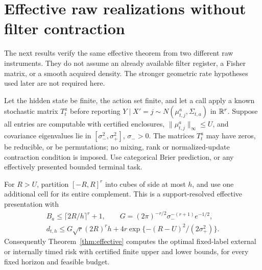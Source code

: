 \section{Effective raw realizations without filter contraction}\label{sec:effective_realizations}
The next results verify the same effective theorem from two different raw instruments. They do not assume an already available filter register, a Fisher matrix, or a smooth acquired density. The stronger geometric rate hypotheses used later are not required here.

\begin{theorem}\label{thm:effective_gaussian}
Let the hidden state be finite, the action set finite, and let a call apply a known stochastic matrix $T_t^a$ before reporting $Y\mid X'=j\sim N(\mu_{t,j}^a,\Sigma_{t,a})$ in $\mathbb R^r$. Suppose all entries are computable with certified enclosures, $\|\mu_{t,j}^a\|_\infty\le U$, and covariance eigenvalues lie in $[\sigma_-^2,\sigma_+^2]$, $\sigma_->0$. The matrices $T_t^a$ may have zeros, be reducible, or be permutations; no mixing, rank or normalized-update contraction condition is imposed. Use categorical Brier prediction, or any effectively presented bounded terminal task.

For $R>U$, partition $[-R,R]^r$ into cubes of side at most $h$, and use one additional cell for its entire complement. This is a support-resolved effective presentation with
\begin{equation}\label{eq:gaussian_effective}
 \begin{gathered}
 B_a\le\lceil2R/h\rceil^r+1,\qquad
 G=(2\pi)^{-r/2}\sigma_-^{-(r+1)}e^{-1/2},\\
 d_{t,h}\le G\sqrt r(2R)^r h+
                  4r\exp\{- (R-U)^2/(2\sigma_+^2)\}.
 \end{gathered}
\end{equation}
Consequently Theorem~\ref{thm:effective} computes the optimal fixed-label external or internally timed risk with certified finite upper and lower bounds, for every fixed horizon and feasible budget.
\end{theorem}
